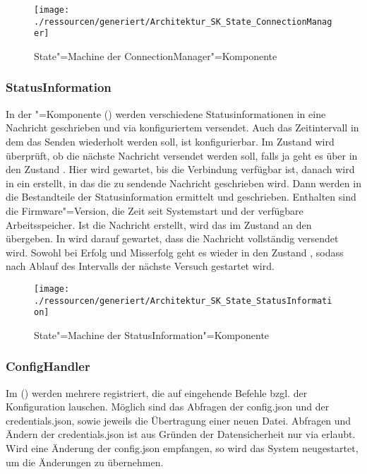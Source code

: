 \begin{figure}[!htb]
    \centering
    \texttt{[image: ./ressourcen/generiert/Architektur\_SK\_State\_ConnectionManager]}
    \caption{State"=Machine der ConnectionManager"=Komponente}
    \label{fig:Architektur_SK_State_ConnectionManager}
\end{figure}

\subsubsection{StatusInformation}
In der "=Komponente () werden verschiedene Statusinformationen in eine Nachricht geschrieben und via konfiguriertem  versendet.
Auch das Zeitintervall in dem das Senden wiederholt werden soll, ist konfigurierbar.
Im Zustand  wird überprüft, ob die nächste Nachricht versendet werden soll, falls ja geht es über in den Zustand .
Hier wird gewartet, bis die Verbindung verfügbar ist, danach wird in  ein  erstellt, in das die zu sendende Nachricht geschrieben wird.
Dann werden in  die Bestandteile der Statusinformation ermittelt und geschrieben.
Enthalten sind die Firmware"=Version, die Zeit seit Systemstart und der verfügbare Arbeitsspeicher.
Ist die Nachricht erstellt, wird das  im Zustand  an den  übergeben.
In  wird darauf gewartet, dass die Nachricht vollständig versendet wird.
Sowohl bei Erfolg und Misserfolg geht es wieder in den Zustand , sodass nach Ablauf des Intervalls der nächste Versuch gestartet wird.

\begin{figure}[!htb]
    \centering
    \texttt{[image: ./ressourcen/generiert/Architektur\_SK\_State\_StatusInformation]}
    \caption{State"=Machine der StatusInformation"=Komponente}
    \label{fig:Architektur_SK_State_StatusInformation}
\end{figure}

\subsubsection{ConfigHandler}
Im  () werden mehrere  registriert, die auf eingehende Befehle bzgl. der Konfiguration lauschen.
Möglich sind das Abfragen der config.json und der credentials.json, sowie jeweils die Übertragung einer neuen Datei.
Abfragen und Ändern der credentials.json ist aus Gründen der Datensicherheit nur via  erlaubt.
Wird eine Änderung der config.json empfangen, so wird das System neugestartet, um die Änderungen zu übernehmen.

